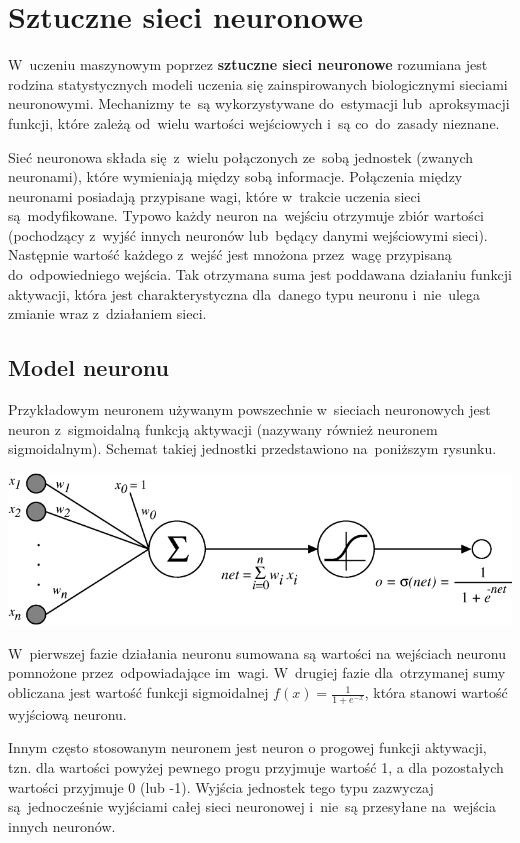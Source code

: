 \chapter{Sztuczne sieci neuronowe}
W~uczeniu maszynowym poprzez \textbf{sztuczne sieci neuronowe} rozumiana jest rodzina statystycznych modeli
uczenia się zainspirowanych biologicznymi sieciami neuronowymi. Mechanizmy te~są wykorzystywane do~estymacji
lub~aproksymacji funkcji, które zależą od~wielu wartości wejściowych i~są co~do~zasady nieznane.

Sieć neuronowa składa się~z~wielu połączonych ze~sobą jednostek (zwanych neuronami), które wymieniają między
sobą informacje. Połączenia między neuronami posiadają przypisane wagi, które w~trakcie uczenia sieci
są~modyfikowane. Typowo każdy neuron na~wejściu otrzymuje zbiór wartości (pochodzący z~wyjść innych neuronów
lub~będący danymi wejściowymi sieci). Następnie wartość każdego z~wejść jest mnożona przez~wagę przypisaną
do~odpowiedniego wejścia. Tak otrzymana suma jest poddawana działaniu funkcji aktywacji, która jest
charakterystyczna dla~danego typu neuronu i~nie~ulega zmianie wraz z~działaniem sieci.

\section{Model neuronu}
Przykładowym neuronem używanym powszechnie w~sieciach neuronowych jest neuron z~sigmoidalną funkcją aktywacji
(nazywany również neuronem sigmoidalnym). Schemat takiej jednostki przedstawiono na~poniższym rysunku.

\begin{Figure}
	\centering
	\includegraphics[width=\linewidth]{img/sigmoid-neuron.png}
\end{Figure}

W~pierwszej fazie działania neuronu sumowana są wartości na wejściach neuronu pomnożone przez~odpowiadające
im~wagi. W~drugiej fazie dla~otrzymanej sumy obliczana jest wartość funkcji sigmoidalnej
$f(x)=\frac{1}{1+e^{-x}}$, która stanowi wartość wyjściową neuronu.

Innym często stosowanym neuronem jest neuron o progowej funkcji aktywacji, tzn. dla wartości powyżej pewnego
progu przyjmuje wartość 1, a dla pozostałych wartości przyjmuje 0 (lub -1). Wyjścia jednostek tego typu
zazwyczaj są~jednocześnie wyjściami całej sieci neuronowej i~nie~są przesyłane na~wejścia innych neuronów.

